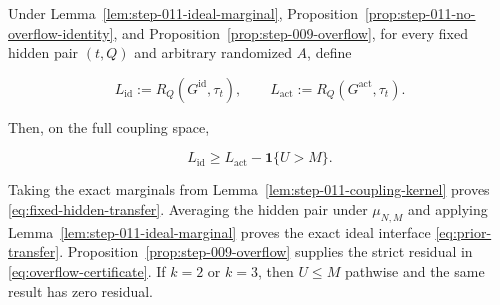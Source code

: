 \begin{proposition}\label{prop:step-011-risk-transfer}
Under Lemma~\ref{lem:step-011-ideal-marginal},
Proposition~\ref{prop:step-011-no-overflow-identity}, and Proposition~\ref{prop:step-009-overflow}, for every fixed hidden pair
\((t,Q)\) and arbitrary randomized \(A\), define

\[
  L_{\mathrm{id}}:=R_Q(G^{\mathrm{id}},\tau_t),
  \qquad
  L_{\mathrm{act}}:=R_Q(G^{\mathrm{act}},\tau_t).
\tag{S11.23}\label{eq:step-011-23}
\]

Then, on the full coupling space,

\[
  L_{\mathrm{id}}
  \ge L_{\mathrm{act}}-\mathbf1\{U>M\}.
\tag{S11.24}\label{eq:step-011-24}
\]

Taking the exact marginals from
Lemma~\ref{lem:step-011-coupling-kernel} proves \eqref{eq:fixed-hidden-transfer}. Averaging the hidden
pair under \(\mu_{N,M}\) and applying
Lemma~\ref{lem:step-011-ideal-marginal} proves the exact ideal
interface \eqref{eq:prior-transfer}. Proposition~\ref{prop:step-009-overflow}
supplies the strict residual in \eqref{eq:overflow-certificate}.
If \(k=2\) or \(k=3\), then \(U\le M\) pathwise and the same result has
zero residual.
\end{proposition}

